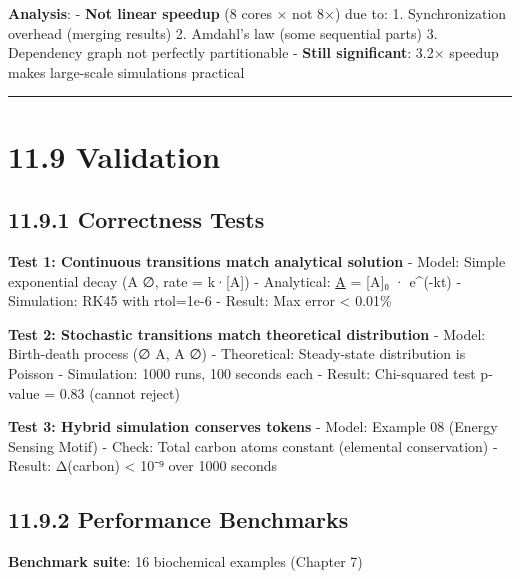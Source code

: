 \textbf{Analysis}: - \textbf{Not linear speedup} (8 cores × not 8×)
due to: 1. Synchronization overhead (merging results) 2. Amdahl's law
(some sequential parts) 3. Dependency graph not perfectly partitionable
- \textbf{Still significant}: 3.2× speedup makes large-scale simulations
practical

\begin{center}\rule{0.5\linewidth}{0.5pt}\end{center}

\hypertarget{validation}{%
\section{11.9 Validation}\label{validation}}

\hypertarget{correctness-tests}{%
\subsection{11.9.1 Correctness Tests}\label{correctness-tests}}

\textbf{Test 1: Continuous transitions match analytical solution} -
Model: Simple exponential decay (A \textrightarrow ∅, rate = k·{[}A{]}) - Analytical:
\href{t}{A} = {[}A{]}₀ · e\^{}(-kt) - Simulation: RK45 with rtol=1e-6 -
Result: Max error \textless{} 0.01\% \checkmark

\textbf{Test 2: Stochastic transitions match theoretical distribution} -
Model: Birth-death process (∅ \textrightarrow A, A \textrightarrow ∅) - Theoretical: Steady-state
distribution is Poisson - Simulation: 1000 runs, 100 seconds each -
Result: Chi-squared test p-value = 0.83 (cannot reject) \checkmark

\textbf{Test 3: Hybrid simulation conserves tokens} - Model: Example 08
(Energy Sensing Motif) - Check: Total carbon atoms constant (elemental
conservation) - Result: Δ(carbon) \textless{} 10⁻⁹ over 1000 seconds \checkmark

\hypertarget{performance-benchmarks}{%
\subsection{11.9.2 Performance
Benchmarks}\label{performance-benchmarks}}

\textbf{Benchmark suite}: 16 biochemical examples (Chapter 7)

